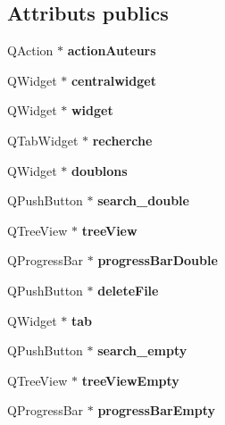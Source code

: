\subsection*{Attributs publics}
\begin{DoxyCompactItemize}
\item 
Q\-Action $\ast$ {\bfseries action\-Auteurs}\label{class_ui___org_view_a6a1ea7b9ba65e164adea9e4cf2da9a94}

\item 
Q\-Widget $\ast$ {\bfseries centralwidget}\label{class_ui___org_view_a60c22c7cae0804f412bffda4eb37fe89}

\item 
Q\-Widget $\ast$ {\bfseries widget}\label{class_ui___org_view_a500ed1d489b4d1dfebc6a81b0c61e5af}

\item 
Q\-Tab\-Widget $\ast$ {\bfseries recherche}\label{class_ui___org_view_acc72cfe0a57954b542e45813e1388662}

\item 
Q\-Widget $\ast$ {\bfseries doublons}\label{class_ui___org_view_a9bc9e46ec3a4274d2b2b9447a2340ebd}

\item 
Q\-Push\-Button $\ast$ {\bfseries search\-\_\-double}\label{class_ui___org_view_a225f3433070d7e4c89f16992bda97613}

\item 
Q\-Tree\-View $\ast$ {\bfseries tree\-View}\label{class_ui___org_view_a8fe6ded92ad2b37a338f98d09526083a}

\item 
Q\-Progress\-Bar $\ast$ {\bfseries progress\-Bar\-Double}\label{class_ui___org_view_a7e438ecee8e00a03b1d7d5c195177c54}

\item 
Q\-Push\-Button $\ast$ {\bfseries delete\-File}\label{class_ui___org_view_a63c176c0aff655c9931f59557f3ea3e1}

\item 
Q\-Widget $\ast$ {\bfseries tab}\label{class_ui___org_view_a580c7f71489da0743643d8fe14c77960}

\item 
Q\-Push\-Button $\ast$ {\bfseries search\-\_\-empty}\label{class_ui___org_view_a6ecf92571008c68476629e3ba8839ff1}

\item 
Q\-Tree\-View $\ast$ {\bfseries tree\-View\-Empty}\label{class_ui___org_view_a333b2176baad37a8063871be07b77bc9}

\item 
Q\-Progress\-Bar $\ast$ {\bfseries progress\-Bar\-Empty}\label{class_ui___org_view_a4048e44486bc30b35835dc76c3b15a58}


\end{DoxyCompactItemize}
